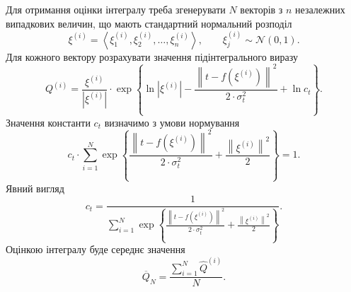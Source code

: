 Для отримання оцінки інтегралу
треба згенерувати $N$ векторів з $n$ незалежних випадкових величин,
що мають стандартний нормальний розподіл
\begin{equation*}
  \xi^{\left( i \right)}
  = \left\langle \xi^{\left( i \right)}_1, \xi^{\left( i \right)}_2, \dots,
  \xi^{\left( i \right)}_n \right\rangle,\qquad
  \xi^{\left( i \right)}_j \sim \mathcal{N}\left( 0, 1 \right).
\end{equation*}
Для кожного вектору розрахувати значення підінтегрального виразу
\begin{equation*}
  Q^{\left( i \right)}
  = \frac{\xi^{\left( i \right)}}{\left| \xi^{\left( i \right)} \right|}
  \cdot \exp{\left\{
      \ln{\left| \xi^{\left( i \right)} \right|}
      - \frac{\left\| t - f\left( \xi^{\left( i \right)} \right) \right\|^2}
             {2 \cdot \sigma^2_t}
      + \ln{c_t}
     \right\}
   }.
\end{equation*}
Значення константи $c_t$ визначимо з умови нормування
\begin{equation*}
  c_t \cdot
  \sum_{i=1}^{N}
    \exp{\left\{
      \frac{\left\| t - f\left( \xi^{\left( i \right)} \right) \right\|^2}
           {2 \cdot \sigma^2_t}
       + \frac{\left\| \xi^{\left( i \right)} \right\|^2}{2}
     \right\}}
  = 1.
\end{equation*}
Явний вигляд
\begin{equation*}
  c_t
  = \frac{1}{\sum\limits_{i=1}^{N}
    \exp{\left\{
      \frac{\left\| t - f\left( \xi^{\left( i \right)} \right) \right\|^2}
           {2 \cdot \sigma^2_t}
      + \frac{\left\| \xi^{\left( i \right)} \right\|^2}{2}
    \right\}}}.
\end{equation*}
Оцінкою інтегралу буде середнє значення
\begin{equation*}
  \overline{Q}_N = \frac{\sum\limits_{i=1}^{N}
    \hat{Q}^{\left( i \right)}}{N}.
\end{equation*}


